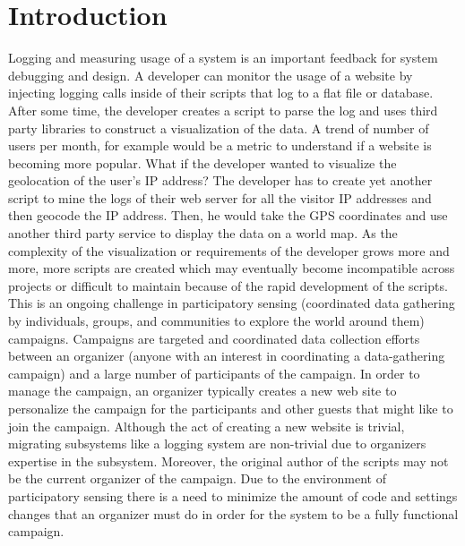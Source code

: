 \documentclass[10pt,a4paper,english]{article}
\begin{document}
\pagebreak{}




\hypertarget{introduction}{}
\section*{Introduction}
\label{introduction}

Logging and measuring usage of a system is an important feedback for system debugging and design. A developer can monitor the usage of a website by injecting logging calls inside of their scripts that log to a flat file or database. After some time, the developer creates a script to parse the log and uses third party libraries to construct a visualization of the data. A trend of number of users per month, for example would be a metric to understand if a website is becoming more popular. What if the developer wanted to visualize the geolocation of the user's IP address? The developer has to create yet another script to mine the logs of their web server for all the visitor IP addresses and then geocode the IP address. Then, he would take the GPS coordinates and use another third party service to display the data on a world map. As the complexity of the visualization or requirements of the developer grows more and more, more scripts are created which may eventually become incompatible across projects or difficult to maintain because of the rapid development of the scripts. This is an ongoing challenge in participatory sensing (coordinated data gathering by individuals, groups, and communities to explore the world around them) campaigns. Campaigns are targeted and coordinated data collection efforts between an organizer (anyone with an interest in coordinating a data-gathering campaign) and a large number of participants of the campaign. In order to manage the campaign, an organizer typically creates a new web site to personalize the campaign for the participants and other guests that might like to join the campaign. Although the act of creating a new website is trivial, migrating subsystems like a logging system are non-trivial due to organizers expertise in the subsystem. Moreover, the original author of the scripts may not be the current organizer of the campaign. Due to the environment of participatory sensing there is a need to minimize the amount of code and settings changes that an organizer must do in order for the system to be a fully functional campaign.
\end{document}
